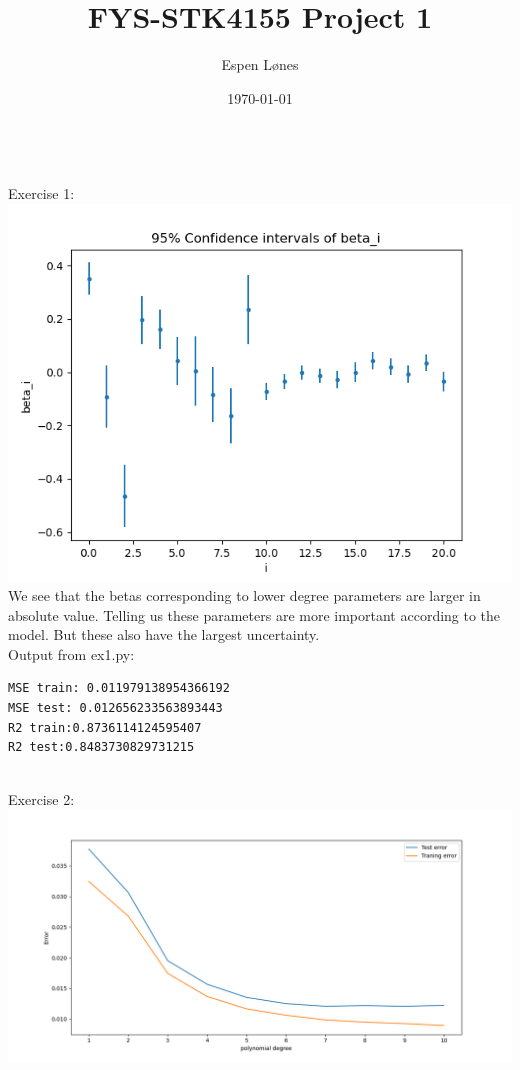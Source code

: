\documentclass[12pt, letterpaper, twoside]{article}
\begin{document}
\title{FYS-STK4155 Project 1}
\author{Espen Lønes}
\date{\today}
\maketitle
\ \\
Exercise 1:\\
\includegraphics[scale=0.8]{"Confidence_beta.png"}\\
We see that the betas corresponding to lower degree parameters are larger in absolute value. Telling us these parameters are more important according to the model. But these also have the largest uncertainty. 
\newpage
\ \\
Output from ex1.py:\\
\begin{verbatim}
MSE train: 0.011979138954366192
MSE test: 0.012656233563893443
R2 train:0.8736114124595407
R2 test:0.8483730829731215
\end{verbatim}
\ \\
Exercise 2:\\
\includegraphics[scale=0.5]{"ex2_errors.png"}\\
\end{document}
